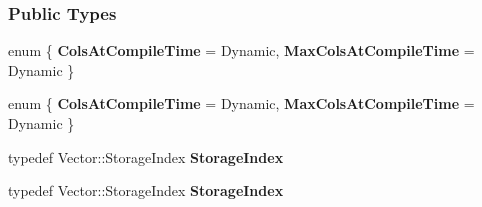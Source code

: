 \subsubsection*{Public Types}
\begin{DoxyCompactItemize}
\item 
\mbox{\label{group___iterative_linear_solvers___module_a3712ee06c6e9c4d232571abb6ab4c4ee}} 
enum \{ {\bfseries Cols\+At\+Compile\+Time} = Dynamic, 
{\bfseries Max\+Cols\+At\+Compile\+Time} = Dynamic
 \}
\item 
\mbox{\label{group___iterative_linear_solvers___module_ae694e3e6e574b75d6fd9dfe06521f21e}} 
enum \{ {\bfseries Cols\+At\+Compile\+Time} = Dynamic, 
{\bfseries Max\+Cols\+At\+Compile\+Time} = Dynamic
 \}
\item 
\mbox{\label{group___iterative_linear_solvers___module_a21a4ddda2e64177b5afc4c7c45a6ced9}} 
typedef Vector\+::\+Storage\+Index {\bfseries Storage\+Index}
\item 
\mbox{\label{group___iterative_linear_solvers___module_a21a4ddda2e64177b5afc4c7c45a6ced9}} 
typedef Vector\+::\+Storage\+Index {\bfseries Storage\+Index}
\end{DoxyCompactItemize}
